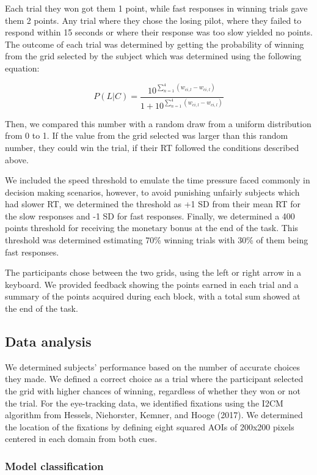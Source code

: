 \documentclass[
  english,
  man]{apa6}
\begin{document}
Each trial they won got them 1 point, while fast responses in winning trials gave them 2 points. Any trial where they chose the losing pilot, where they failed to respond within 15 seconds or where their response was too slow yielded no points. The outcome of each trial was determined by getting the probability of winning from the grid selected by the subject which was determined using the following equation:

\[P(L|C) = \frac {10^{\sum_{n=1}^ {4} (w_{ci,l} - w_{ci,l})}} {1+10^{\sum_{n=1}^ {4} (w_{ci,l} - w_{ci,l})}}\]

Then, we compared this number with a random draw from a uniform distribution from 0 to 1. If the value from the grid selected was larger than this random number, they could win the trial, if their RT followed the conditions described above.

We included the speed threshold to emulate the time pressure faced commonly in decision making scenarios, however, to avoid punishing unfairly subjects which had slower RT, we determined the threshold as +1 SD from their mean RT for the slow responses and -1 SD for fast responses. Finally, we determined a 400 points threshold for receiving the monetary bonus at the end of the task. This threshold was determined estimating 70\% winning trials with 30\% of them being fast responses.

The participants chose between the two grids, using the left or right arrow in a keyboard. We provided feedback showing the points earned in each trial and a summary of the points acquired during each block, with a total sum showed at the end of the task.

\hypertarget{data-analysis}{%
\subsection{Data analysis}\label{data-analysis}}

We determined subjects' performance based on the number of accurate choices they made. We defined a correct choice as a trial where the participant selected the grid with higher chances of winning, regardless of whether they won or not the trial. For the eye-tracking data, we identified fixations using the I2CM algorithm from Hessels, Niehorster, Kemner, and Hooge (2017). We determined the location of the fixations by defining eight squared AOIs of 200x200 pixels centered in each domain from both cues.

\hypertarget{model-classification}{%
\subsubsection{Model classification}\label{model-classification}}
\end{document}
